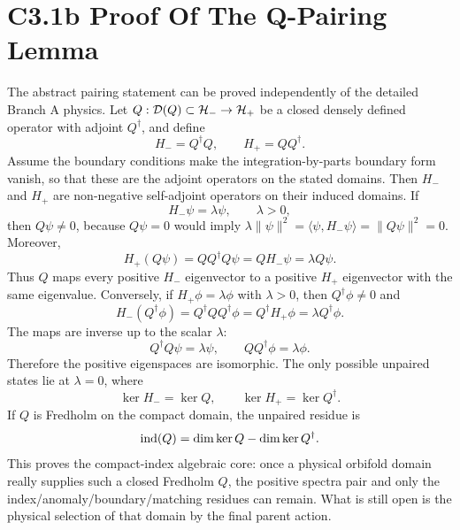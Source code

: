\documentclass[11pt]{article}
\begin{document}
\section{C3.1b Proof Of The Q-Pairing Lemma}
The abstract pairing statement can be proved independently of the detailed
Branch A physics.  Let $Q:{\cal D}(Q)\subset{\cal H}_-\to{\cal H}_+$ be a
closed densely defined operator with adjoint $Q^\dagger$, and define
\begin{equation}
H_-=Q^\dagger Q,\qquad H_+=QQ^\dagger .
\end{equation}
Assume the boundary conditions make the integration-by-parts boundary form
vanish, so that these are the adjoint operators on the stated domains.  Then
$H_-$ and $H_+$ are non-negative self-adjoint operators on their induced
domains.  If
\begin{equation}
H_-\psi=\lambda\psi,\qquad \lambda>0,
\end{equation}
then $Q\psi\neq0$, because $Q\psi=0$ would imply
$\lambda\|\psi\|^2=\langle\psi,H_-\psi\rangle=\|Q\psi\|^2=0$.  Moreover,
\begin{equation}
H_+(Q\psi)=QQ^\dagger Q\psi=QH_-\psi=\lambda Q\psi .
\end{equation}
Thus $Q$ maps every positive $H_-$ eigenvector to a positive $H_+$ eigenvector
with the same eigenvalue.  Conversely, if $H_+\phi=\lambda\phi$ with
$\lambda>0$, then $Q^\dagger\phi\neq0$ and
\begin{equation}
H_-(Q^\dagger\phi)=Q^\dagger QQ^\dagger\phi=Q^\dagger H_+\phi
=\lambda Q^\dagger\phi .
\end{equation}
The maps are inverse up to the scalar $\lambda$:
\begin{equation}
Q^\dagger Q\psi=\lambda\psi,\qquad
QQ^\dagger\phi=\lambda\phi .
\end{equation}
Therefore the positive eigenspaces are isomorphic.  The only possible unpaired
states lie at $\lambda=0$, where
\begin{equation}
\ker H_-=\ker Q,\qquad \ker H_+=\ker Q^\dagger .
\end{equation}
If $Q$ is Fredholm on the compact domain, the unpaired residue is
\begin{equation}
{\rm ind}(Q)=\dim\ker Q-\dim\ker Q^\dagger .
\end{equation}
This proves the compact-index algebraic core: once a physical orbifold domain
really supplies such a closed Fredholm $Q$, the positive spectra pair and only
the index/anomaly/boundary/matching residues can remain.  What is still open is
the physical selection of that domain by the final parent action.
\end{document}

